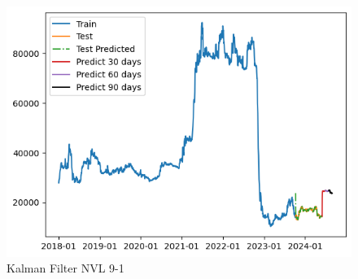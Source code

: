 \documentclass[conference]{IEEEtran}
\begin{document}
\begin{figure}[htbp]
\begin{minipage}{0.23\textwidth}
    \includegraphics[width=1\textwidth]{experiment/kf/NVL 9-1.png}
    \caption{Kalman Filter NVL 9-1}
    \label{fig:nvl_histogram}
    \end{minipage}
\end{figure}
\end{document}
